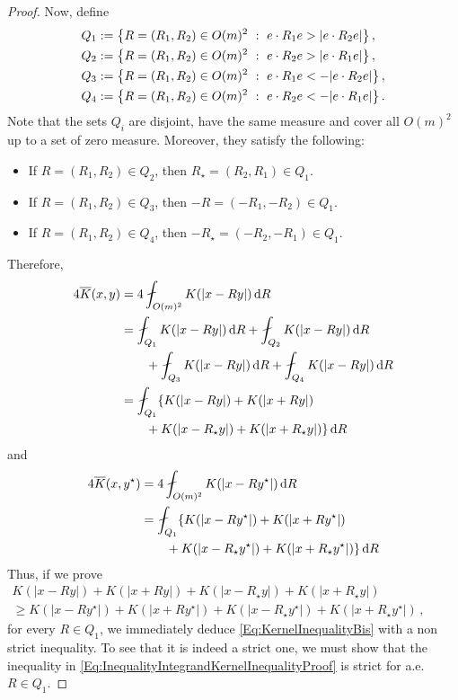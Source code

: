 \begin{proof}
Now, define
\begin{equation}
\label{Eq:DefQ}
	\begin{split}
	Q_1 &:= \left \{ R = (R_1,R_2) \in O(m)^2 \ : \ e\cdot R_1 e > |e\cdot R_2 e| \right \},\\
	Q_2 &:= \left \{ R = (R_1,R_2) \in O(m)^2 \ : \ e\cdot R_2 e > |e\cdot R_1 e| \right \},\\
	Q_3 &:= \left \{ R = (R_1,R_2) \in O(m)^2 \ : \ e\cdot R_1 e < -|e\cdot R_2 e| \right \},\\
	Q_4 &:= \left \{ R = (R_1,R_2) \in O(m)^2 \ : \ e\cdot R_2 e < - |e\cdot R_1 e| \right \}.
	\end{split}
\end{equation}
Note that the sets $Q_i$ are disjoint, have the same measure and cover all $O(m)^2$ up to a set of zero measure. Moreover, they satisfy the following:
\begin{itemize}
\item If $R = (R_1, R_2)\in Q_2$, then $R_\star = (R_2, R_1) \in Q_1$.
\item If $R = (R_1, R_2)\in Q_3$, then $-R = (-R_1, -R_2) \in Q_1$.
\item If $R = (R_1, R_2)\in Q_4$, then $-R_\star = (-R_2, -R_1) \in Q_1$.
\end{itemize}
Therefore,
\begin{align*}
4\overline{K} (x, y) &= 4\average_{O(m)^2} K(|x - R y|)\d R \\
& = \average_{Q_1} K(|x - R y|)\d R + \average_{Q_2} K(|x - R y|)\d R \\
& \quad \quad
+ \average_{Q_3} K(|x - R y|)\d R +
\average_{Q_4} K(|x - R y|)\d R \\
&= \average_{Q_1} \{K(|x - R y|) + K(|x + R y|) \\
&\quad \quad + K(|x - R_\star y|) + K(|x + R_\star y|)\}\d R
\end{align*}
and
\begin{align*}
4\overline{K} (x, y^\star) &= 4\average_{O(m)^2} K(|x - R y^\star|)\d R \\
& = \average_{Q_1} \{K(|x - R y^\star|) + K(|x + R y^\star|) \\
&\quad \quad + K(|x - R_\star y^\star|) + K(|x + R_\star y^\star|)\}\d R
\end{align*}
Thus, if we prove
\begin{equation}
\label{Eq:InequalityIntegrandKernelInequalityProof}
\begin{split}
K(|x - R y|) + K(|x + R y|) + K(|x - R_\star y|) + K(|x + R_\star y|)
\quad \quad \quad \quad \quad \quad \quad \quad
\\
\geq
K(|x - R y^\star|) + K(|x + R y^\star|)+K(|x - R_\star y^\star|) + K(|x + R_\star y^\star|)\,,
\end{split}
\end{equation}
for every $R\in Q_1$, we immediately deduce \eqref{Eq:KernelInequalityBis} with a non strict inequality. To see that it is indeed a strict one, we must show that the inequality in \eqref{Eq:InequalityIntegrandKernelInequalityProof} is strict for a.e. $R \in Q_1$.



\end{proof}

